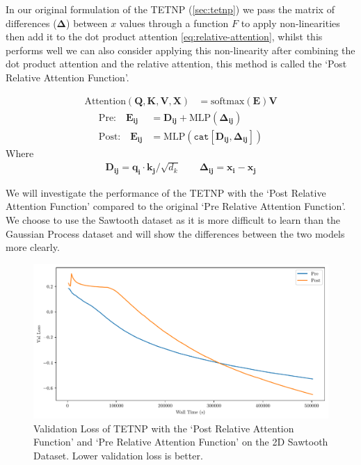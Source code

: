 \documentclass[../../main.tex]{subfiles}
\begin{document}

In our original formulation of the TETNP (\autoref{sec:tetnp}) we pass the matrix of differences ($\bm{\Delta}$) between $x$ values through a function $F$ to apply non-linearities then add it to the dot product attention \autoref{eq:relative-attention}, whilst this performs well we can also consider applying this non-linearity after combining the dot product attention and the relative attention, this method is called the `Post Relative Attention Function'. 

\begin{align}
	\text{Attention}(\bm{Q}, \bm{K}, \bm{V}, \bm{X}) &= \text{softmax}\left(\bm{E} \right) \bm{V}
\end{align}
\begin{align}
	\text{Pre:} \quad \bm{E_{ij}} &= \bm{D_{ij}}+ \text{MLP}(\bm{\Delta_{ij}})\\
    \text{Post:} \quad \bm{E_{ij}} &= \text{MLP}(\texttt{cat}[ \bm{D_{ij}}, \bm{\Delta_{ij}}])
\end{align}
Where 
\begin{align}
     \bm{D_{ij}} = \bm{q_i} \cdot \bm{k_j}  /\sqrt{d_k} \quad \quad    \bm{\Delta_{ij}} = \bm{x_i} - \bm{x_j}
\end{align}


We will investigate the performance of the TETNP with the `Post Relative Attention Function' compared to the original `Pre Relative Attention Function'. We choose to use the Sawtooth dataset as it is more difficult to learn than the Gaussian Process dataset and will show the differences between the two models more clearly. 


\begin{figure}[H]
    \centering
    \includegraphics[width=0.8\linewidth]{./fig/post-pre-kernel.pdf}
    \caption{Validation Loss of TETNP with the `Post Relative Attention Function' and `Pre Relative Attention Function' on the 2D Sawtooth Dataset. Lower validation loss is better.}
    \label{fig:post-pre-kernel}
\end{figure}
\end{document}
